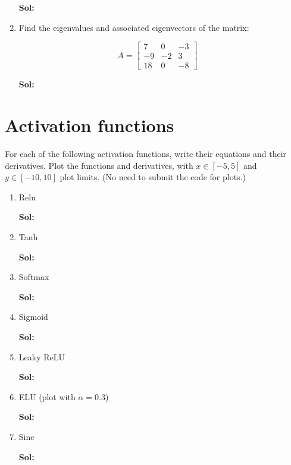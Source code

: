 \documentclass[11pt]{article}
\begin{document}
\begin{enumerate}
\textbf{Sol:}
  
  \newpage

\item Find the eigenvalues and associated eigenvectors of the matrix:

$$A = \left[\begin{array}{rrr} 7 & 0 & -3\\ -9 & -2 & 3 \\ 18 & 0 & -8 \end{array}\right] \quad $$

\textbf{Sol:}
  
  \newpage


\end{enumerate}


\section{Activation functions}
For each of the following activation functions, write their equations and their derivatives. Plot the functions and derivatives, with $x\in \left[-5, 5\right]$ and $y\in\left[-10,10\right]$ plot limits. (No need to submit the code for plots.)

\begin{enumerate}
    \item Relu
    
    \textbf{Sol:}
  
  \newpage
  
    \item Tanh
    
    \textbf{Sol:}
  
  \newpage
  
    \item Softmax
    
    \textbf{Sol:}
  
  \newpage
  
    \item Sigmoid
    
    \textbf{Sol:}
  
  \newpage
  
    \item Leaky ReLU
    
    \textbf{Sol:}
  
  \newpage
    \item ELU (plot with $\alpha=0.3$)
    
    \textbf{Sol:}
  
  \newpage
    \item Sinc
    
    \textbf{Sol:}
\end{enumerate}

\vspace{20pt}
\end{document}
